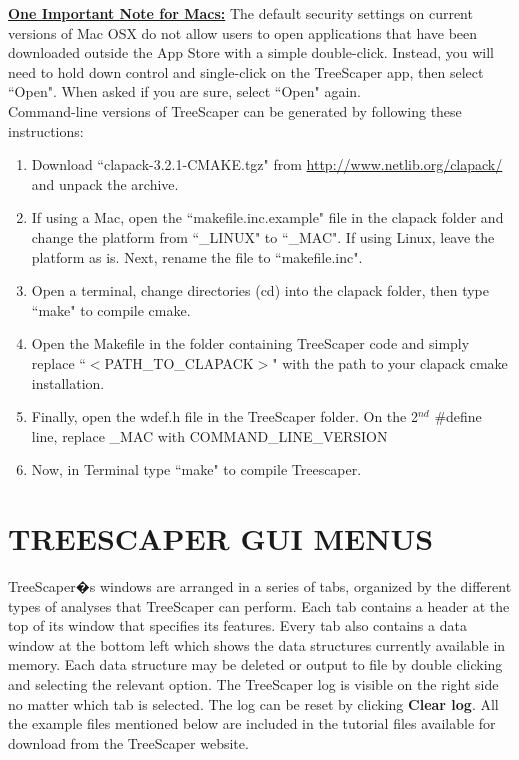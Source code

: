 \documentclass[11pt]{article}
\begin{document}
\noindent \ul{\bf One Important Note for Macs:} The default security settings on current versions of Mac OSX do not allow users to open applications that have been downloaded outside the App Store
with a simple double-click. Instead, you will need to hold down control and single-click on
the TreeScaper app, then select ``Open". When asked if you are sure, select ``Open" again. \\


Command-line versions of TreeScaper can be generated by following these instructions:
\begin{enumerate}[(1)]
\item Download ``clapack-3.2.1-CMAKE.tgz" from {\color{blue}\url{http://www.netlib.org/clapack/}} and
unpack the archive.

\item If using a Mac, open the ``makefile.inc.example" file in the clapack folder and change
the platform from ``\_LINUX" to ``\_MAC". If using Linux, leave the platform as is.
Next, rename the file to ``makefile.inc".

\item Open a terminal, change directories (cd) into the clapack folder, then type ``make" to
compile cmake.

\item Open the Makefile in the folder containing TreeScaper code and simply replace
``$<$PATH\_TO\_CLAPACK$>$" with the path to your clapack cmake installation.

\item Finally, open the wdef.h file in the TreeScaper folder. On the 2$^{nd}$ \#define line, replace
\_MAC with COMMAND\_LINE\_VERSION

\item Now, in Terminal type ``make" to compile Treescaper. \\
\end{enumerate}



\newpage
\section{TREESCAPER GUI MENUS}\label{sect:TreeScaperGuiMenus}

TreeScaper�s windows are arranged in a series of tabs, organized by the different types
of analyses that TreeScaper can perform. Each tab contains a header at the top of its window
that specifies its features. Every tab also contains a data window at the bottom left which
shows the data structures currently available in memory. Each data structure may be deleted
or output to file by double clicking and selecting the relevant option. The TreeScaper log is
visible on the right side no matter which tab is selected. The log can be reset by clicking {\bf Clear
log}. All the example files mentioned below are included in the tutorial files available for
download from the TreeScaper website. \\
\end{document}

